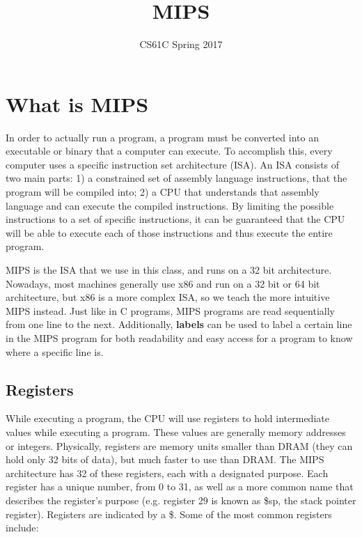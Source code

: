 \documentclass{article}
\title{MIPS}
\author{CS61C Spring 2017}
\date{ }
\begin{document}
\maketitle
\tableofcontents

\section{What is MIPS}
In order to actually run a program, a program must be converted into an executable or binary that a computer can execute. To accomplish this, every computer uses a specific instruction set architecture (ISA). An ISA consists of two main parts: 1) a constrained set of assembly language instructions, that the program will be compiled into; 2) a CPU that understands that assembly language and can execute the compiled instructions. By limiting the possible instructions to a set of specific instructions, it can be guaranteed that the CPU will be able to execute each of those instructions and thus execute the entire program.

MIPS is the ISA that we use in this class, and runs on a 32 bit architecture. Nowadays, most machines generally use x86 and run on a 32 bit or 64 bit architecture, but x86 is a more complex ISA, so we teach the more intuitive MIPS instead. Just like in C programs, MIPS programs are read sequentially from one line to the next.  Additionally, \textbf{labels} can be used to label a certain line in the MIPS program for both readability and easy access for a program to know where a specific line is.

\subsection{Registers}
While executing a program, the CPU will use registers to hold intermediate values while executing a program. These values are generally memory addresses or integers. Physically, registers are memory units smaller than DRAM (they can hold only 32 bits of data), but much faster to use than DRAM. The MIPS architecture has 32 of these registers, each with a designated purpose. Each register has a unique number, from 0 to 31, as well as a more common name that describes the register's purpose (e.g. register 29 is known as \$sp, the stack pointer register). Registers are indicated by a \$. Some of the most common registers include: 
\end{document}
